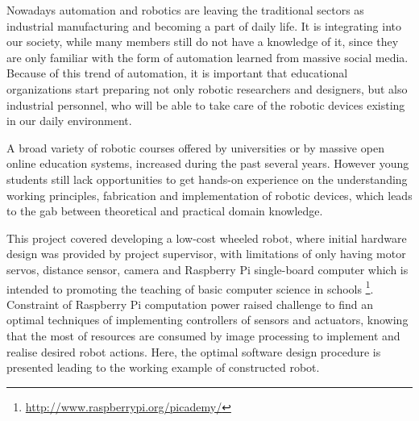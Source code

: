 Nowadays automation and robotics are leaving the traditional sectors as industrial manufacturing and becoming a part of daily life. It is integrating into our society, while many members still do not have a knowledge of it, since they are only familiar with the form of automation learned from massive social media.
Because of this trend of automation, it is important that educational organizations start preparing not only robotic researchers and designers, but also industrial personnel, who will be able
to take care of the robotic devices existing in our daily environment. 

A broad variety of robotic courses offered by universities or by massive open online education systems, increased during the past several years. However young students still lack opportunities to get hands-on experience on the understanding working principles, fabrication and implementation of robotic devices, which leads to the gab between theoretical and practical domain knowledge.

This project covered developing a low-cost wheeled robot, where initial hardware design was provided by project supervisor, with limitations of only having motor servos, distance sensor, camera and Raspberry Pi single-board computer which is intended to promoting the teaching of basic computer science in schools \footnote{\url{http://www.raspberrypi.org/picademy/}}.
Constraint of  Raspberry Pi computation power raised challenge to find an  optimal techniques of implementing controllers of sensors and actuators, knowing that the most of resources are consumed by image processing to implement and realise desired robot actions. Here, the optimal software design procedure is presented leading to the working example of constructed robot.

